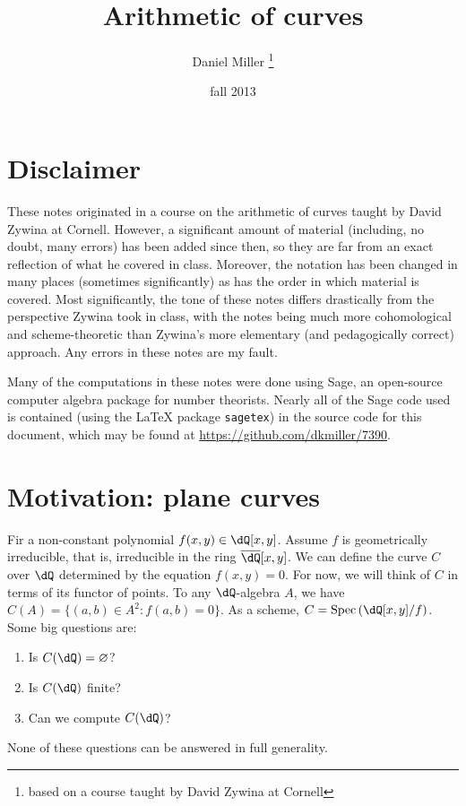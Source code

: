 \documentclass{article}
\title{Arithmetic of curves}
\author{Daniel Miller
  \thanks{based on a course taught by David Zywina at Cornell}}
\date{fall 2013}
\begin{document}
\maketitle
\tableofcontents





\newpage
\section*{Disclaimer}

These notes originated in a course on the arithmetic of curves taught by David 
Zywina at Cornell. However, a significant amount of material (including, no 
doubt, many errors) has been added since then, so they are far from an exact 
reflection of what he covered in class. Moreover, the notation has been changed 
in many places (sometimes significantly) as has the order in which material is 
covered. Most significantly, the tone of these notes differs drastically 
from the perspective Zywina took in class, with the notes being much more 
cohomological and scheme-theoretic than Zywina's more elementary (and 
pedagogically correct) approach. Any errors in these notes are my fault. 

Many of the computations in these notes were done using Sage, an open-source 
computer algebra package for number theorists. Nearly all of the Sage code 
used is contained (using the \LaTeX{} package \texttt{sagetex}) in the source 
code for this document, which may be found at 
\url{https://github.com/dkmiller/7390}. 










\section*{Motivation: plane curves}





Fir a non-constant polynomial $f(x,y)\in\dQ[x,y]$. Assume $f$ is 
geometrically irreducible, that is, irreducible in the ring 
$\overline{\dQ}[x,y]$. We can define the curve $C$ over $\dQ$ determined by the 
equation $f(x,y)=0$. For now, we will think of $C$ in terms of its functor of 
points. To any $\dQ$-algebra $A$, we have $C(A)=\{(a,b)\in A^2:f(a,b)=0\}$. 
As a scheme, $C=\spec\left(\dQ[x,y]/f\right)$. Some big questions are:
\begin{enumerate}
  \item Is $C(\dQ)=\varnothing$?
  \item Is $C(\dQ)$ finite?
  \item Can we compute $C(\dQ)$?
\end{enumerate}
None of these questions can be answered in full generality. 
\end{document}
